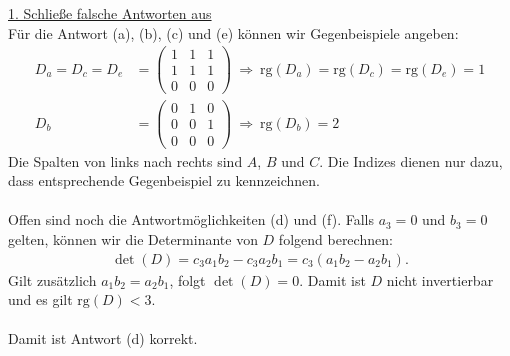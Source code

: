 \underline{1. Schließe falsche Antworten aus}\\
Für die Antwort (a), (b), (c) und (e) können wir Gegenbeispiele angeben:
\begin{align*}
	D_a = D_c = D_e
	&=
	\begin{pmatrix}
		1 & 1  & 1\\
		1 & 1 & 1\\
		0 & 0 & 0
	\end{pmatrix}
	\ \Rightarrow \
	\mathrm{rg}(D_a) = \mathrm{rg}(D_c) = \mathrm{rg}(D_e) = 1\\
	D_b
	&=
	\begin{pmatrix}
		0 & 1  & 0 \\
		0 & 0 & 1\\
		0 & 0 & 0
	\end{pmatrix}
	\ \Rightarrow \
	\mathrm{rg}(D_b) = 2
\end{align*}
Die Spalten von links nach rechts sind $A$, $B$ und $C$. Die Indizes dienen nur dazu, dass entsprechende Gegenbeispiel zu kennzeichnen.\\
\\
Offen sind noch die Antwortmöglichkeiten (d) und (f). 
Falls $a_3 = 0 $ und $b_3 = 0 $ gelten, können wir die Determinante von $D$ folgend berechnen:
\begin{align*}
	\det(D) = c_3 a_1 b_2 - c_3 a_2 b_1
	= c_3 ( a_1 b_2 - a_2 b_1).
\end{align*}
Gilt zusätzlich $a_1 b_2 = a_2 b_1$, folgt $\det(D) = 0$. Damit ist $D$ nicht invertierbar und es gilt $\mathrm{rg}(D) < 3$.\\
\\
Damit ist Antwort (d) korrekt.



\newpage
